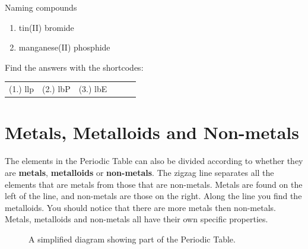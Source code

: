\begin{exercises}{Naming compounds}
{\begin{enumerate}[noitemsep, label=\textbf{\arabic*}. ]
\begin{enumerate}[noitemsep, label=\textbf{\alph*}. ]
\item tin(II) bromide
\item manganese(II) phosphide
\end{enumerate}
\end{enumerate}
    \label{m38708*cid5}
\par {} Find the answers with the shortcodes:
 \par \begin{tabular}[h]{cccccc}
 (1.) llp  &  (2.) lbP  &  (3.) lbE   & & \end{tabular}}
\end{exercises}
            \section{Metals, Metalloids and Non-metals}
            \nopagebreak
      \label{m38708*id65693}The elements in the Periodic Table can also be divided according to whether they are \textbf{metals}, \textbf{metalloids} or \textbf{non-metals}. The zigzag line separates all the elements that are metals from those that are non-metals. Metals are found on the left of the line, and non-metals are those on the right. Along the line you find the metalloids. You should notice that there are more metals then non-metals. Metals, metalloids and non-metals all have their own specific properties.\par 
\begin{figure}[h]

\begin{center}
\end{center}
\caption{A simplified diagram showing part of the Periodic Table.}
\label{fig:periodic}
\end{figure} 
      \label{m38708*uid76}

